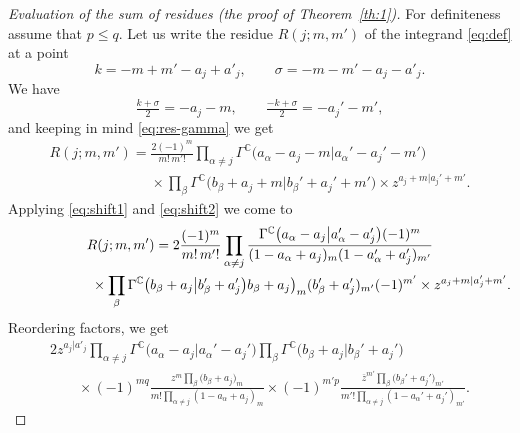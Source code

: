 \documentclass[11pt]{article}
\numberwithin{equation}{section}
\numberwithin{equation}{section}
\def\ov{\overline}
\def\C {{\mathbb C }}
\def\le{\leqslant}
\begin{document}
\begin{proof}[Evaluation of the sum of residues (the proof of Theorem~\ref{th:1})]
For definiteness assume that $p\le q$.
Let us write the residue $R(j;m,m')$ of the integrand \eqref{eq:def}
at a point
\[
k= -m+m'-a_j+a'_j,\qquad \sigma=-m-m'-a_j-a'_j.
\]
We have
\[
\tfrac{k+\sigma}{2}=-a_j-m,\qquad \tfrac{-k+\sigma}{2}=-a_j'-m',
\]
and
keeping in mind \eqref{eq:res-gamma} we get
\begin{gather*}
R(j;m,m')=\frac{2(-1)^m}{m!\,m'!}
 \prod_{\alpha\ne j}
\Gamma^\C\big(a_\alpha-a_j-m\big|a_\alpha'-a_j'-m'\big)\\
\phantom{R(j;m,m')=}{} \times
\prod_{\beta} \Gamma^\C\big(b_\beta+a_j+m\big|b_\beta'+a_j'+m'\big)
\times z^{a_j+m|a_j'+m'}.
\end{gather*}
Applying \eqref{eq:shift1} and \eqref{eq:shift2} we come to
\begin{gather*}
R(j;m,m')=2 \frac{(-1)^m}{m!\,m'!}
\prod_{\alpha\ne j} \frac{\Gamma^\C\big(
a_\alpha-a_j\big|a_\alpha'-a_j'\big)(-1)^{m}}
{(1-a_\alpha+a_j)_m(1-a_\alpha'+a_j')_{m'}} \\
\hphantom{R(j;m,m')=}{} \times
\prod_{\beta} \Gamma^\C\big(b_\beta+a_j\big|b_\beta'+a_j'\big)
b_\beta+a_j\big)_m(b_\beta'+a_j')_{m'} (-1)^{m'}
\times z^{a_j+m|a_j'+m'}.
\end{gather*}
Reordering factors, we get
\begin{gather*}
2 z^{a_j|a'_j}
\prod_{\alpha\ne j} \Gamma^\C\big(a_\alpha-a_j\big|a_\alpha'-a_j'\big)
\prod_{\beta}
\Gamma^\C\big(b_\beta+a_j\big|b_\beta'+a_j'\big) \\
\qquad{}\times
(-1)^{mq} \frac{z^m \prod\limits_{\beta}(b_\beta+a_j\big)_{m}}
{m!\prod\limits_{\alpha\ne j} (1-a_\alpha+a_j)_{m}}
 \times
(-1)^{m'p} \frac{\ov z^{m'} \prod\limits_{\beta}(b_\beta'+a_j'\big)_{m'}}
{m'!\prod\limits_{\alpha\ne j} (1-a_\alpha'+a_j')_{m'}}.
\end{gather*}


\end{proof}
\end{document}
